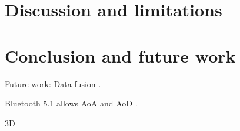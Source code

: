 \chapter{Discussion and limitations}
\label{chap:discussion}
\chapter{Conclusion and future work}
\label{chap:conclusion}

Future work: Data fusion \cite{barsocchi_detecting_2021}.

Bluetooth 5.1 allows AoA and AoD \cite{barsocchi_detecting_2021}.

3D